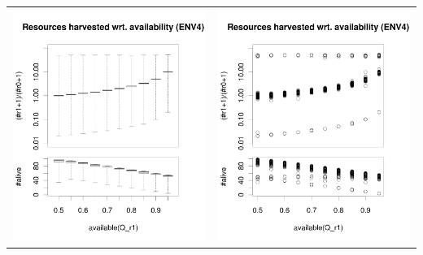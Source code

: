 \documentclass[a4paper,10pt]{article}
\begin{document}
\begin{table}[h!]
\begin{tabular}{cc}
\includegraphics[width=\imgSize]{images/5StaticEnv/ratioAndRep_staticEnv4LogY}&\includegraphics[width=\imgSize]{images/5StaticEnv/ratioAndRep_staticEnvPlot4LogY}\\

\end{tabular}
\end{table}
\end{document}
